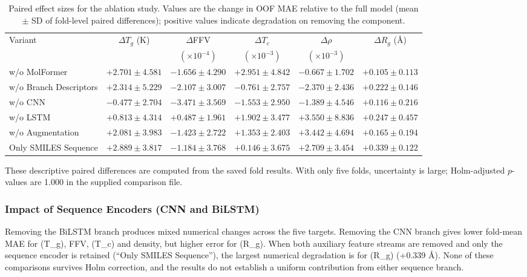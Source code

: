 \documentclass{article}
\begin{document}
\begin{table}[H]
\centering
\caption{Paired effect sizes for the ablation study. Values are the change in OOF MAE relative to the full model (mean $\pm$ SD of fold-level paired differences); positive values indicate degradation on removing the component.}
\label{tab:ablation_delta}
\scriptsize
\setlength{\tabcolsep}{3pt}
\begin{tabular}{lccccc}
\toprule
Variant & $\Delta T_g$ (K) & $\Delta$FFV & $\Delta T_c$ & $\Delta\rho$ & $\Delta R_g$ (\AA) \\
 & & $(\times 10^{-4})$ & $(\times 10^{-3})$ & $(\times 10^{-3})$ & \\
\midrule
w/o MolFormer & $+2.701 \pm 4.581$ & $-1.656 \pm 4.290$ & $+2.951 \pm 4.842$ & $-0.667 \pm 1.702$ & $+0.105 \pm 0.113$ \\
w/o Branch Descriptors & $+2.314 \pm 5.229$ & $-2.107 \pm 3.007$ & $-0.761 \pm 2.757$ & $-2.370 \pm 2.436$ & $+0.222 \pm 0.146$ \\
w/o CNN & $-0.477 \pm 2.704$ & $-3.471 \pm 3.569$ & $-1.553 \pm 2.950$ & $-1.389 \pm 4.546$ & $+0.116 \pm 0.216$ \\
w/o LSTM & $+0.813 \pm 4.314$ & $+0.487 \pm 1.961$ & $+1.902 \pm 3.477$ & $+3.550 \pm 8.836$ & $+0.247 \pm 0.457$ \\
w/o Augmentation & $+2.081 \pm 3.983$ & $-1.423 \pm 2.722$ & $+1.353 \pm 2.403$ & $+3.442 \pm 4.694$ & $+0.165 \pm 0.194$ \\
Only SMILES Sequence & $+2.889 \pm 3.817$ & $-1.184 \pm 3.768$ & $+0.146 \pm 3.675$ & $+2.709 \pm 3.454$ & $+0.339 \pm 0.122$ \\
\bottomrule
\end{tabular}

\vspace{0.5em}
\footnotesize
These descriptive paired differences are computed from the saved fold results. With only five folds, uncertainty is large; Holm-adjusted $p$-values are 1.000 in the supplied comparison file.
\end{table}

\subsubsection{Impact of Sequence Encoders (CNN and BiLSTM)}

Removing the BiLSTM branch produces mixed numerical changes across the five targets. Removing the CNN branch gives lower fold-mean MAE for (T_g), FFV, (T_c) and density, but higher error for (R_g). When both auxiliary feature streams are removed and only the sequence encoder is retained (``Only SMILES Sequence''), the largest numerical degradation is for (R_g) (+0.339 \AA). None of these comparisons survives Holm correction, and the results do not establish a uniform contribution from either sequence branch.
\end{document}
